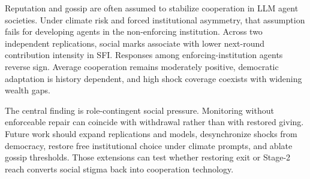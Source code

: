 Reputation and gossip are often assumed to stabilize cooperation in LLM agent societies.
Under climate risk and forced institutional asymmetry, that assumption fails for developing agents in the non-enforcing institution.
Across two independent replications, social marks associate with lower next-round contribution intensity in SFI.
Responses among enforcing-institution agents reverse sign.
Average cooperation remains moderately positive, democratic adaptation is history dependent, and high shock coverage coexists with widening wealth gaps.

The central finding is role-contingent social pressure.
Monitoring without enforceable repair can coincide with withdrawal rather than with restored giving.
Future work should expand replications and models, desynchronize shocks from democracy, restore free institutional choice under climate prompts, and ablate gossip thresholds.
Those extensions can test whether restoring exit or Stage-2 reach converts social stigma back into cooperation technology.

